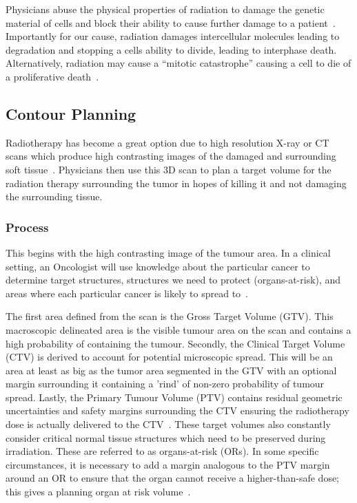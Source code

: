 \documentclass[11pt,twoside]{report}
\begin{document}
Physicians abuse the physical properties of radiation to damage the genetic material of cells and block their ability to cause further damage to a patient~\cite{radiotherapy-advances}. Importantly for our cause, radiation damages intercellular molecules leading to degradation and stopping a cells ability to divide, leading to interphase death. Alternatively, radiation may cause a ``mitotic catastrophe'' causing a cell to die of a proliferative death~\cite{cell-death}. 

\subsection{Contour Planning}\label{sect:contour-planning}

Radiotherapy has become a great option due to high resolution X-ray or CT scans which produce high contrasting images of the damaged and surrounding soft tissue~\cite{radiotherapy-basic-concepts}. Physicians then use this 3D scan to plan a target volume for the radiation therapy surrounding the tumor in hopes of killing it and not damaging the surrounding tissue.

\subsubsection{Process}

This begins with the high contrasting image of the tumour area. In a clinical setting, an Oncologist will use knowledge about the particular cancer to determine target structures, structures we need to protect (organs-at-risk), and areas where each particular cancer is likely to spread to~\cite{AMLART-data}. 

The first area defined from the scan is the Gross Target Volume (GTV). This macroscopic delineated area is the visible tumour area on the scan and contains a high probability of containing the tumour. Secondly, the Clinical Target Volume (CTV) is derived to account for potential microscopic spread. This will be an area at least as big as the tumor area segmented in the GTV with an optional margin surrounding it containing a 'rind' of non-zero probability of tumour spread. Lastly, the Primary Tumour Volume (PTV) contains residual geometric uncertainties and safety margins surrounding the CTV ensuring the radiotherapy dose is actually delivered to the CTV~\cite{tumor-delineation,defining-target-volumes,Lin2021-oz,personalised-PTV-strategies}. These target volumes also constantly consider critical normal tissue structures which need to be preserved during irradiation. These are referred to as organs-at-risk (ORs). In some specific circumstances, it is necessary to add a margin analogous to the PTV margin around an OR to ensure that the organ cannot receive a higher-than-safe dose; this gives a planning organ at risk volume~\cite{defining-target-volumes}.
\end{document}
